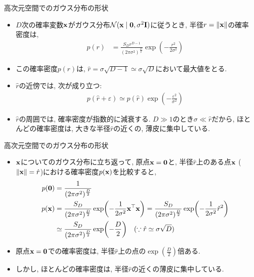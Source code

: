 \documentclass[dvipdfmx,notheorems,t]{beamer}
\begin{document}
\begin{frame}{高次元空間でのガウス分布の形状}
\begin{itemize}
  \item $D$次の確率変数$\vb{x}$がガウス分布$\mathcal{N}(\vb{x} \mid \vb{0}, \sigma^2 \vb{I})$に従うとき,
  半径$r = \left\| \vb{x} \right\|$の確率密度は,
  \begin{align*}
    p(r) &= \frac{S_D r^{D - 1}}{(2\pi \sigma^2)^\frac{D}{2}} \exp(-\frac{r^2}{2 \sigma^2})
  \end{align*}

  \item この確率密度$p(r)$は, $\hat{r} = \sigma \sqrt{D - 1} \simeq \sigma \sqrt{D}$において最大値をとる.
  \item $\hat{r}$の近傍では, 次が成り立つ:
  \begin{align*}
    p(\hat{r} + \varepsilon) \simeq p(\hat{r}) \exp(-\frac{\varepsilon^2}{\sigma^2})
  \end{align*}

  \item $\hat{r}$の周囲では, 確率密度が指数的に減衰する.
  $D \gg 1$のとき$\sigma \ll \hat{r}$だから, ほとんどの確率密度は, 大きな半径$\hat{r}$の近くの, 薄皮に集中している.
\end{itemize}
\end{frame}

\begin{frame}{高次元空間でのガウス分布の形状}
\begin{itemize}
  \item $\vb{x}$についてのガウス分布に立ち返って, 原点$\vb{x} = \vb{0}$と,
  半径$\hat{r}$上のある点$\vb{x}$ ($\left\| \vb{x} \right\| = \hat{r}$)における確率密度$p(\vb{x})$を比較すると,
  \begin{align*}
    p(\vb{0}) &= \frac{1}{(2\pi \sigma^2)^\frac{D}{2}} \\
    p(\vb{x}) &= \frac{S_D}{(2\pi \sigma^2)^\frac{D}{2}} \exp(-\frac{1}{2 \sigma^2} \vb{x}^\top \vb{x})
      = \frac{S_D}{(2\pi \sigma^2)^\frac{D}{2}} \exp(-\frac{1}{2 \sigma^2} \hat{r}^2) \\
      &\simeq \frac{S_D}{(2\pi \sigma^2)^\frac{D}{2}} \exp(-\frac{D}{2}) \quad
      (\because \hat{r} \simeq \sigma \sqrt{D})
  \end{align*}

  \item 原点$\vb{x} = \vb{0}$での確率密度は, 半径$\hat{r}$上の点の$\exp(\frac{D}{2})$倍ある.
  \item しかし, ほとんどの確率密度は, 半径$\hat{r}$の近くの薄皮に集中している.
\end{itemize}
\end{frame}
\end{document}
